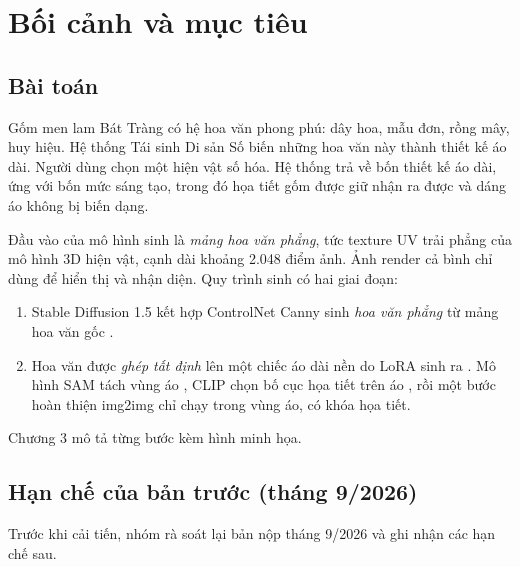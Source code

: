 \chapter{Bối cảnh và mục tiêu}

\section{Bài toán}

Gốm men lam Bát Tràng có hệ hoa văn phong phú: dây hoa, mẫu đơn, rồng mây, huy hiệu. Hệ thống Tái sinh Di sản Số biến những hoa văn này thành thiết kế áo dài. Người dùng chọn một hiện vật số hóa. Hệ thống trả về bốn thiết kế áo dài, ứng với bốn mức sáng tạo, trong đó họa tiết gốm được giữ nhận ra được và dáng áo không bị biến dạng.

Đầu vào của mô hình sinh là \emph{mảng hoa văn phẳng}, tức texture UV trải phẳng của mô hình 3D hiện vật, cạnh dài khoảng 2.048 điểm ảnh. Ảnh render cả bình chỉ dùng để hiển thị và nhận diện. Quy trình sinh có hai giai đoạn:
\begin{enumerate}
  \item Stable Diffusion 1.5 kết hợp ControlNet Canny sinh \emph{hoa văn phẳng} từ mảng hoa văn gốc \cite{rombach2022,zhang2023controlnet}.
  \item Hoa văn được \emph{ghép tất định} lên một chiếc áo dài nền do LoRA sinh ra \cite{hu2021lora}. Mô hình SAM tách vùng áo \cite{kirillov2023sam}, CLIP chọn bố cục họa tiết trên áo \cite{radford2021clip}, rồi một bước hoàn thiện img2img chỉ chạy trong vùng áo, có khóa họa tiết.
\end{enumerate}
Chương 3 mô tả từng bước kèm hình minh họa.

\section{Hạn chế của bản trước (tháng 9/2026)}

Trước khi cải tiến, nhóm rà soát lại bản nộp tháng 9/2026 và ghi nhận các hạn chế sau.

